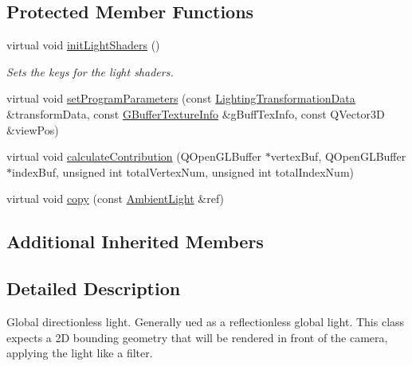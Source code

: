 \subsection*{Protected Member Functions}
\begin{DoxyCompactItemize}
\item 
\mbox{\label{class_geometry_engine_1_1_geometry_world_item_1_1_geometry_light_1_1_ambient_light_a0d27aaf4867e35c545f572ff2cf8c251}} 
virtual void \mbox{\hyperlink{class_geometry_engine_1_1_geometry_world_item_1_1_geometry_light_1_1_ambient_light_a0d27aaf4867e35c545f572ff2cf8c251}{init\+Light\+Shaders}} ()
\begin{DoxyCompactList}\small\item\em Sets the keys for the light shaders. \end{DoxyCompactList}\item 
virtual void \mbox{\hyperlink{class_geometry_engine_1_1_geometry_world_item_1_1_geometry_light_1_1_ambient_light_a37469f72317d3d9cd0e5fb46fbf5fedf}{set\+Program\+Parameters}} (const \mbox{\hyperlink{class_geometry_engine_1_1_lighting_transformation_data}{Lighting\+Transformation\+Data}} \&transform\+Data, const \mbox{\hyperlink{class_geometry_engine_1_1_g_buffer_texture_info}{G\+Buffer\+Texture\+Info}} \&g\+Buff\+Tex\+Info, const Q\+Vector3D \&view\+Pos)
\item 
virtual void \mbox{\hyperlink{class_geometry_engine_1_1_geometry_world_item_1_1_geometry_light_1_1_ambient_light_a4f1d4fb9ad25626e15c28de03b610b4f}{calculate\+Contribution}} (Q\+Open\+G\+L\+Buffer $\ast$vertex\+Buf, Q\+Open\+G\+L\+Buffer $\ast$index\+Buf, unsigned int total\+Vertex\+Num, unsigned int total\+Index\+Num)
\item 
virtual void \mbox{\hyperlink{class_geometry_engine_1_1_geometry_world_item_1_1_geometry_light_1_1_ambient_light_a1c70ea9fb43e4242ef93ffd154304988}{copy}} (const \mbox{\hyperlink{class_geometry_engine_1_1_geometry_world_item_1_1_geometry_light_1_1_ambient_light}{Ambient\+Light}} \&ref)
\end{DoxyCompactItemize}
\subsection*{Additional Inherited Members}


\subsection{Detailed Description}
Global directionless light. Generally ued as a reflectionless global light. This class expects a 2D bounding geometry that will be rendered in front of the camera, applying the light like a filter. 


